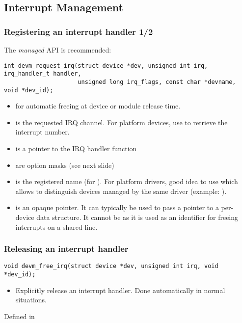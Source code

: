 \subsection{Interrupt Management}

\begin{frame}[fragile]
  \frametitle{Registering an interrupt handler 1/2}
  The {\em managed} API is recommended:
  \begin{verbatim}
int devm_request_irq(struct device *dev, unsigned int irq, irq_handler_t handler,
                     unsigned long irq_flags, const char *devname, void *dev_id);
  \end{verbatim}
  \begin{itemize}
  \item {} for automatic freeing at device or module
        release time.
  \item {} is the requested IRQ channel. For platform
        devices, use  to retrieve the
        interrupt number.
  \item {} is a pointer to the IRQ handler function
  \item {} are option masks (see next slide)
  \item {} is the registered name (for
	). For platform drivers, good idea
	to use  which allows to distinguish
	devices managed by the same driver (example: ).
  \item {} is an opaque pointer. It can typically
        be used to pass a pointer to a per-device data structure.
        It cannot be  as it is used as an identifier for
        freeing interrupts on a shared line.
  \end{itemize}
\end{frame}

\begin{frame}[fragile]
  \frametitle{Releasing an interrupt handler}
  \begin{verbatim}
void devm_free_irq(struct device *dev, unsigned int irq, void *dev_id);
  \end{verbatim}
  \begin{itemize}
  \item Explicitly release an interrupt handler. Done automatically
        in normal situations.
  \end{itemize}
  Defined in 
\end{frame}


